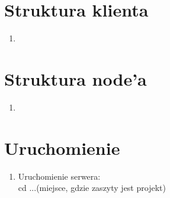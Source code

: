 \documentclass[12pt]{article}
\begin{document}
\section{Struktura klienta}
\begin{enumerate}
	\item 
\end{enumerate}

\section{Struktura node'a}
\begin{enumerate}
	\item 
\end{enumerate}

\section{Uruchomienie}
\begin{enumerate}
	\item Uruchomienie serwera:\\
		cd ...(miejsce, gdzie zaszyty jest projekt)\\
		
		
\end{enumerate}
\end{document}
